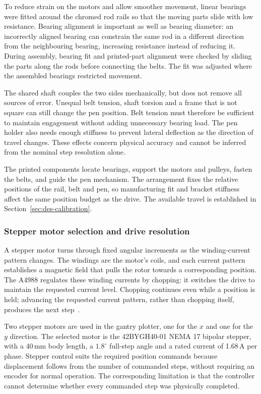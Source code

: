 To reduce strain on the motors and allow smoother movement, linear bearings were fitted around the chromed rod rails so that the moving parts slide with low resistance. Bearing alignment is important as well as bearing diameter: an incorrectly aligned bearing can constrain the same rod in a different direction from the neighbouring bearing, increasing resistance instead of reducing it. During assembly, bearing fit and printed-part alignment were checked by sliding the parts along the rods before connecting the belts. The fit was adjusted where the assembled bearings restricted movement.

The shared shaft couples the two sides mechanically, but does not remove all sources of error. Unequal belt tension, shaft torsion and a frame that is not square can still change the pen position. Belt tension must therefore be sufficient to maintain engagement without adding unnecessary bearing load. The pen holder also needs enough stiffness to prevent lateral deflection as the direction of travel changes. These effects concern physical accuracy and cannot be inferred from the nominal step resolution alone.

The printed components locate bearings, support the motors and pulleys, fasten the belts, and guide the pen mechanism. The arrangement fixes the relative positions of the rail, belt and pen, so manufacturing fit and bracket stiffness affect the same position budget as the drive. The available travel is established in Section~\ref{sec:des-calibration}.

\subsubsection{Stepper motor selection and drive resolution}
\label{sec:des-drive}
A stepper motor turns through fixed angular increments as the winding-current pattern changes. The windings are the motor's coils, and each current pattern establishes a magnetic field that pulls the rotor towards a corresponding position. The A4988 regulates these winding currents by chopping: it switches the drive to maintain the requested current level. Chopping continues even while a position is held; advancing the requested current pattern, rather than chopping itself, produces the next step~\cite[p.~9]{a4988ds}.

Two stepper motors are used in the gantry plotter, one for the $x$ and one for the $y$ direction. The selected motor is the 42BYGH40-01 NEMA 17 bipolar stepper, with a 40\,mm body length, a $1.8^\circ$ full-step angle and a rated current of 1.68\,A per phase. Stepper control suits the required position commands because displacement follows from the number of commanded steps, without requiring an encoder for normal operation. The corresponding limitation is that the controller cannot determine whether every commanded step was physically completed.

